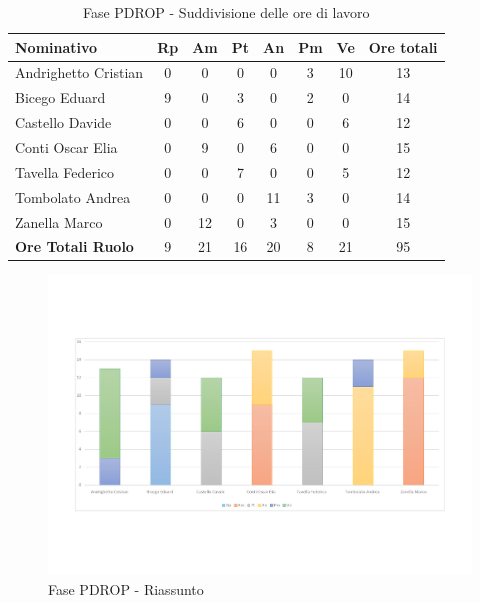\documentclass[../PianoProgetto.tex]{subfiles}
\begin{document}
	\begin{table}[H]
		\begin{tabularx}{\textwidth}{l  * {6}{C}  c}
			\toprule
			\textbf{Nominativo} & \textbf{Rp} & \textbf{Am} & \textbf{Pt} 
						& \textbf{An} & \textbf{Pm} & \textbf{Ve} & \textbf{Ore totali} \\
			\midrule
			Andrighetto Cristian  & 0 & 0 & 0 & 0 & 3 & 10 & 13 \\
			Bicego Eduard  & 9 & 0 & 3 & 0 & 2 & 0 & 14 \\
			Castello Davide  & 0 & 0 & 6 & 0 & 0 & 6 & 12 \\
			Conti Oscar Elia  & 0& 9 & 0 & 6 & 0 & 0 & 15 \\
			Tavella Federico  & 0 & 0 & 7 & 0 & 0 & 5 & 12 \\
			Tombolato Andrea  & 0 & 0 & 0 & 11 & 3 & 0 & 14 \\
			Zanella Marco & 0 & 12 & 0 & 3 & 0 & 0 & 15 \\
			\midrule
			\textbf{Ore Totali Ruolo} & 9 & 21 & 16 & 20 & 8 & 21 & 95 \\
			\bottomrule
			
		\end{tabularx}
		\caption{Fase PDROP - Suddivisione delle ore di lavoro}
		\label{tab:fasePDROP_ore}
	\end{table}
	
\newpage
\vfill	
		
	\begin{figure}[H]
		\centering
		\includegraphics[width=\textwidth , trim=2cm 4cm 2cm 4cm]{grafici/PDROP/PDROP-ore-persona}
			\caption{Fase PDROP - Riassunto}
		\label{fig:BarChart-fasePDROP_ore}
	\end{figure}
\vfill	
	
\end{document}

